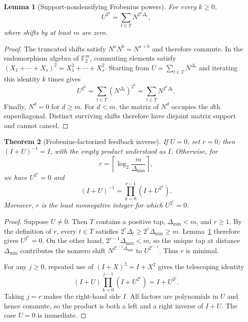 \documentclass{mcom-l}
\numberwithin{equation}{section}
\newtheorem{theorem}{Theorem}[section]
\newtheorem{lemma}[theorem]{Lemma}
\theoremstyle{definition}
\theoremstyle{remark}
\newcommand{\Ftwo}{\mathbb{F}_2}
\newcommand{\Dmin}{\Delta_{\min}}
\begin{document}
\begin{lemma}[Support-nondensifying Frobenius powers]
\label{lem:frobenius}
For every $k\ge0$,
\begin{equation}
  U^{2^k}=\sum_{t\in T}N^{2^k\Delta_t},
  \label{eq:frobenius}
\end{equation}
where shifts by at least $m$ are zero.
\end{lemma}
\begin{proof}
The truncated shifts satisfy $N^aN^b=N^{a+b}$ and therefore commute.  In the
endomorphism algebra of $\Ftwo^m$, commuting elements satisfy
$(X_1+\cdots+X_s)^2=X_1^2+\cdots+X_s^2$.  Starting from
$U=\sum_{t\in T}N^{\Delta_t}$ and iterating this identity $k$ times gives
\[
  U^{2^k}=\sum_{t\in T}(N^{\Delta_t})^{2^k}
           =\sum_{t\in T}N^{2^k\Delta_t}.
\]
Finally, $N^d=0$ for $d\ge m$.  For $d<m$, the matrix of $N^d$ occupies the
$d$th superdiagonal.  Distinct surviving shifts therefore have disjoint
matrix support and cannot cancel.
\end{proof}

\begin{theorem}[Frobenius-factorized feedback inverse]
\label{thm:inverse}
If $U=0$, set $r=0$; then $(I+U)^{-1}=I$, with the empty product understood
as $I$.  Otherwise, for
\begin{equation}
  r=\left\lceil\log_2\frac{m}{\Dmin}\right\rceil,
  \label{eq:r}
\end{equation}
we have $U^{2^r}=0$ and
\begin{equation}
  (I+U)^{-1}=\prod_{k=0}^{r-1}(I+U^{2^k}).
  \label{eq:inverse}
\end{equation}
Moreover, $r$ is the least nonnegative integer for which $U^{2^r}=0$.
\end{theorem}
\begin{proof}
Suppose $U\ne0$.  Then $T$ contains a positive tap, $\Dmin<m$, and
$r\ge1$.  By the definition of $r$, every $t\in T$ satisfies
$2^r\Delta_t\ge2^r\Dmin\ge m$.  Lemma~\ref{lem:frobenius} therefore gives
$U^{2^r}=0$.  On the other hand,
$2^{r-1}\Dmin<m$, so the unique tap at distance $\Dmin$ contributes the
nonzero shift $N^{2^{r-1}\Dmin}$ to $U^{2^{r-1}}$.  Thus $r$ is minimal.

For any $j\ge0$, repeated use of $(I+X)^2=I+X^2$ gives the telescoping
identity
\begin{equation*}
  (I+U)\prod_{k=0}^{j-1}(I+U^{2^k})=I+U^{2^j}.
\end{equation*}
Taking $j=r$ makes the right-hand side $I$.  All factors are polynomials in
$U$ and hence commute, so the product is both a left and a right inverse of
$I+U$.  The case $U=0$ is immediate.
\end{proof}
\end{document}
